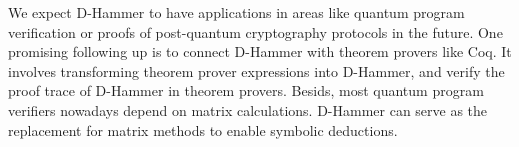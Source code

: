 We expect D-Hammer to have applications in areas like quantum program verification or proofs of post-quantum cryptography protocols in the future.
One promising following up is to connect D-Hammer with theorem provers like Coq. It involves transforming theorem prover expressions into D-Hammer, and verify the proof trace of D-Hammer in theorem provers. Besids, most quantum program verifiers nowadays depend on matrix calculations. D-Hammer can serve as the replacement for matrix methods to enable symbolic deductions.

